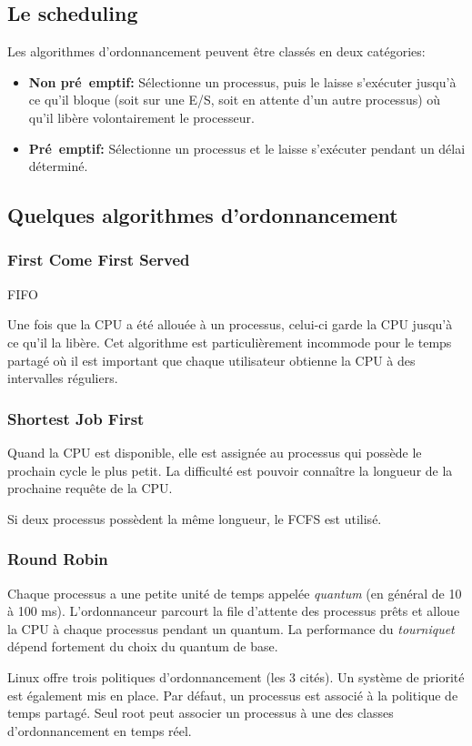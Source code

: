 \documentclass[a4paper,11pt]{article}
\begin{document}
\begin{Form}
\subsection{Le scheduling}
Les algorithmes d’ordonnancement peuvent être classés en deux catégories:
\begin{itemize}
\item \textbf{Non pré~emptif:} Sélectionne un processus, puis le laisse s’exécuter jusqu’à ce qu’il bloque (soit sur une E/S, soit en attente d’un autre processus) où qu’il libère volontairement le processeur.
\item \textbf{Pré~emptif:} Sélectionne un processus et le laisse s’exécuter pendant un délai déterminé.
\end{itemize}
\subsection{Quelques algorithmes d'ordonnancement}
\subsubsection{First Come First Served}
\begin{commentprof}
FIFO
\end{commentprof}
Une fois que la CPU a été allouée à un processus, celui-ci garde la CPU jusqu’à ce qu’il la libère. Cet algorithme est particulièrement incommode pour le temps partagé où il est important que chaque utilisateur obtienne la CPU à des intervalles réguliers.
\subsubsection{Shortest Job First}
Quand la CPU est disponible, elle est assignée au processus qui possède le prochain cycle le plus petit. La difficulté est pouvoir connaître la longueur de la prochaine requête de la CPU.
\begin{commentprof}
 Si deux processus possèdent la même longueur, le FCFS est utilisé.
\end{commentprof}
\subsubsection{Round Robin}
Chaque processus a une petite unité de temps appelée \emph{quantum} (en général de 10 à 100 ms). L'ordonnanceur parcourt la file d’attente des processus prêts et alloue la CPU à chaque processus pendant un quantum. La performance du \emph{tourniquet} dépend fortement du choix du quantum de base. 
\begin{commentprof}
Linux offre trois politiques d'ordonnancement (les 3 cités). Un système de priorité est également mis en place. Par défaut, un processus est associé à la politique de temps partagé. Seul root peut associer un processus à une des classes d’ordonnancement en temps réel.
\end{commentprof}
\end{Form}
\end{document}
